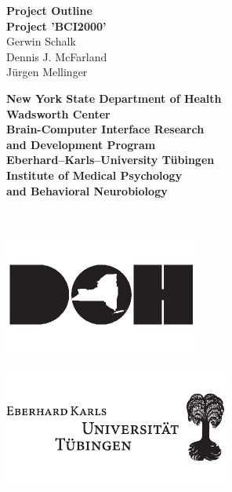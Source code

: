 \begin{titlepage}
\hspace{-7mm}%
\begin{minipage}{\textwidth}
\begin{center}
\vspace{.5cm}
{\large \bf Project Outline\\[3ex]}
{\huge \bf Project 'BCI2000'}
\\[1.5cm]
{\Large Gerwin Schalk\\}
{\Large Dennis J. McFarland\\}
{\Large J\"urgen Mellinger\\[1.5cm]}
%
\begin{minipage}{13cm}
  \begin{minipage}[c]{13cm}
    \begin{center}
      {\Large \bf New York State Department of Health\\[2ex]}
      {\large \bf Wadsworth Center\\[0.5ex]
       Brain-Computer Interface Research \\and Development Program\\[4ex]}
      {\Large \bf Eberhard--Karls--University T\"ubingen\\[2ex]}
      {\large \bf Institute of Medical Psychology\\
                  and Behavioral Neurobiology\\[0.5ex]}
    \end{center}
  \end{minipage}
  \\[1.0cm]
  \begin{minipage}[c]{6cm}
    \centerline{\includegraphics{figures/DOHlogo}}
  \end{minipage}
  \hspace{1.5cm}
  \begin{minipage}[c]{3cm}
    \centerline{\includegraphics{figures/EKUlogo}}

\end{minipage}
\end{minipage}
\end{center}
\end{minipage}
\end{titlepage}
